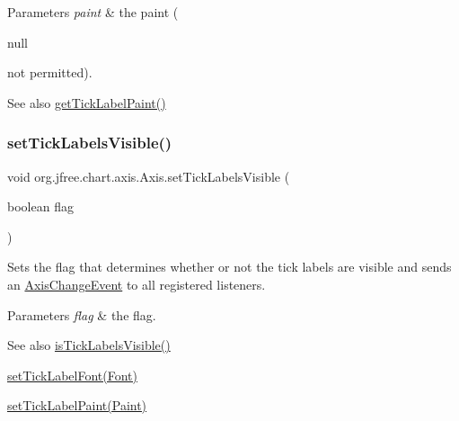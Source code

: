 \begin{DoxyParams}{Parameters}
{\em paint} & the paint (
\begin{DoxyCode}
null 
\end{DoxyCode}
 not permitted).\\
\hline
\end{DoxyParams}
\begin{DoxySeeAlso}{See also}
\mbox{\hyperlink{classorg_1_1jfree_1_1chart_1_1axis_1_1_axis_a76c5c5924b56a2936b516e7fe3ab50ee}{get\+Tick\+Label\+Paint()}} 
\end{DoxySeeAlso}
\mbox{\label{classorg_1_1jfree_1_1chart_1_1axis_1_1_axis_abcdadb52fe3b84309f229467ef6d6f82}} 
\subsubsection{\texorpdfstring{set\+Tick\+Labels\+Visible()}{setTickLabelsVisible()}}
{\footnotesize\ttfamily void org.\+jfree.\+chart.\+axis.\+Axis.\+set\+Tick\+Labels\+Visible (\begin{DoxyParamCaption}\item[{boolean}]{flag }\end{DoxyParamCaption})}

Sets the flag that determines whether or not the tick labels are visible and sends an \mbox{\hyperlink{}{Axis\+Change\+Event}} to all registered listeners.


\begin{DoxyParams}{Parameters}
{\em flag} & the flag.\\
\hline
\end{DoxyParams}
\begin{DoxySeeAlso}{See also}
\mbox{\hyperlink{classorg_1_1jfree_1_1chart_1_1axis_1_1_axis_a243036cb23e9771ee4d26f9b749115cb}{is\+Tick\+Labels\+Visible()}} 

\mbox{\hyperlink{classorg_1_1jfree_1_1chart_1_1axis_1_1_axis_a2a73b99f22d1d3d2a2b9f6e0feb4fcad}{set\+Tick\+Label\+Font(\+Font)}} 

\mbox{\hyperlink{classorg_1_1jfree_1_1chart_1_1axis_1_1_axis_a5ce2c0a548ab9ccc1946f4495120f78a}{set\+Tick\+Label\+Paint(\+Paint)}} 
\end{DoxySeeAlso}
\mbox{\label{classorg_1_1jfree_1_1chart_1_1axis_1_1_axis_a2668a7d63e7a82ca62f94dc27fbc3a80}} 

